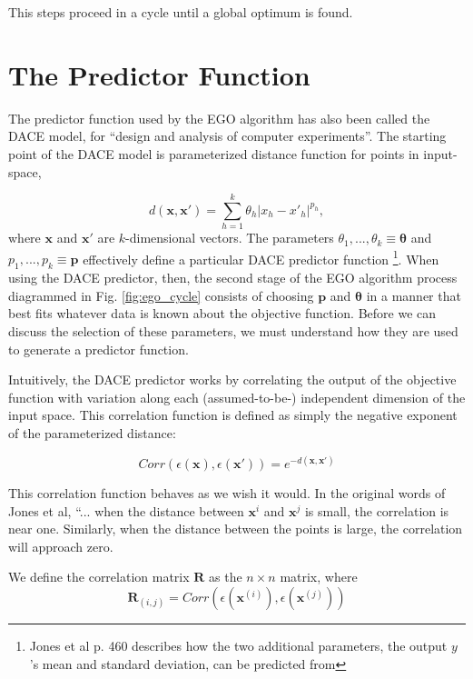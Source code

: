 \documentclass[letterpaper]{article}
\begin{document}
This steps proceed in a cycle until a global optimum is found.


\section{The Predictor Function}

The predictor function used by the EGO algorithm has also been called the DACE model, for ``design and analysis of computer experiments''. The starting point of the DACE model is parameterized distance function for points in input-space,

\begin{equation} \label{eq:dist}
d(\mathbf{x},\mathbf{x'})=\sum_{h=1}^k \theta_h |x_h-x'_h|^{p_h},
\end{equation}
where $\mathbf{x}$ and $\mathbf{x'}$ are $k$-dimensional vectors. The parameters $\theta_1,...,\theta_k \equiv \mathbf{\theta}$ and $p_1,...,p_k\equiv \mathbf{p}$ effectively define a particular DACE predictor function \footnote{Jones et al p. 460 describes how the two additional parameters, the output $y$'s mean and standard deviation, can be predicted from }. When using the DACE predictor, then, the second stage of the EGO algorithm process diagrammed in Fig. \ref{fig:ego_cycle} consists of choosing $\mathbf{p}$ and $\mathbf{\theta}$ in a manner that best fits whatever data is known about the objective function. Before we can discuss the selection of these parameters, we must understand how they are used to generate a predictor function.

Intuitively, the DACE predictor works by correlating the output of the objective function with variation along each (assumed-to-be-) independent dimension of the input space. This correlation function is defined as simply the negative exponent of the parameterized distance:

\begin{equation} \label{eq:corr}
Corr(\epsilon (\mathbf{x}),\epsilon (\mathbf{x}')) = e^{-d(\mathbf{x},\mathbf{x}')}
\end{equation}

This correlation function behaves as we wish it would. In the original words of Jones et al, ``... when the distance between $\mathbf{x}^i$ and $\mathbf{x}^j$ is small,
the correlation is near one. Similarly, when the distance between the points is large,
the correlation will approach zero.


We define the correlation matrix $\mathbf{R}$ as the $n\times n$ matrix, where
\begin{equation} \label{eq:R}
\mathbf{R}_{(i,j)} = Corr(\epsilon (\mathbf{x}^{(i)}),\epsilon (\mathbf{x}^{(j)}))
\end{equation}
\end{document}
